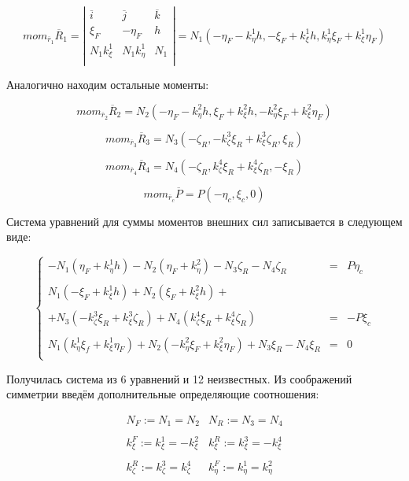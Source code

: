 $$
mom_{\overline{r}_1}\overline{R}_1 = 
\left|
\begin{array}{ccc}
\overline{i} & \overline{j} & \overline{k}\\
\xi_F & -\eta_F & h\\
N_1k_\xi^1 & N_1k_\eta^1 & N_1\\
\end{array}
\right| = N_1(-\eta_F-k_\eta^1h,-\xi_F+k_\xi^1h,k_\eta^1\xi_F+k_\xi^1\eta_F)
$$

Аналогично находим остальные моменты:

$$
mom_{\overline{r}_2}\overline{R}_2 = N_2(-\eta_F-k_\eta^2h,\xi_F+k_\xi^2h,-k_\eta^2\xi_F+k_\xi^2\eta_F)
$$

$$
mom_{\overline{r}_3}\overline{R}_3 = N_3(-\zeta_R,-k_\zeta^3\xi_R+k_\xi^3\zeta_R,\xi_R)
$$

$$
mom_{\overline{r}_4}\overline{R}_4 = N_4(-\zeta_R,k_\zeta^4\xi_R+k_\xi^4\zeta_R,-\xi_R)
$$

$$
mom_{\overline{r}_c}\overline{P} = P(-\eta_c,\xi_c,0)
$$

Система уравнений для суммы моментов внешних сил записывается в следующем виде:

\begin{equation}
\left\{
\begin{array}{rcl}
-N_1(\eta_F+k_\eta^1h)-N_2(\eta_F+k_\eta^2)-N_3\zeta_R-N_4\zeta_R & = & P\eta_c\\
\\
N_1(-\xi_F+k_\xi^1h)+N_2(\xi_F+k_\xi^2h)+\\
\\
+N_3(-k_\zeta^3\xi_R+k_\xi^3\zeta_R)+N_4(k_\zeta^4\xi_R+k_\xi^4\zeta_R) & = & -P\xi_c\\
\\
N_1(k_\eta^1\xi_f+k_\xi^1\eta_F)+N_2(-k_\eta^2\xi_F+k_\xi^2\eta_F)+N_3\xi_R-N_4\xi_R & = & 0\\
\end{array}
\right.
\end{equation}

Получилась система из 6 уравнений и 12 неизвестных. Из соображений симметрии введём дополнительные определяющие соотношения:

$$
\begin{array}{ll}
N_F:=N_1=N_2 & N_R:=N_3=N_4 \\
\\
k_\xi^F:= k_\xi^1 = -k_\xi^2 & k_\xi^R:=k_\xi^3 = -k_\xi^4 \\
\\
k_\zeta^R:=k_\zeta^3 = k_\zeta^4 & k_\eta^F:=k_\eta^1 = k_\eta^2 \\
\end{array}
$$

